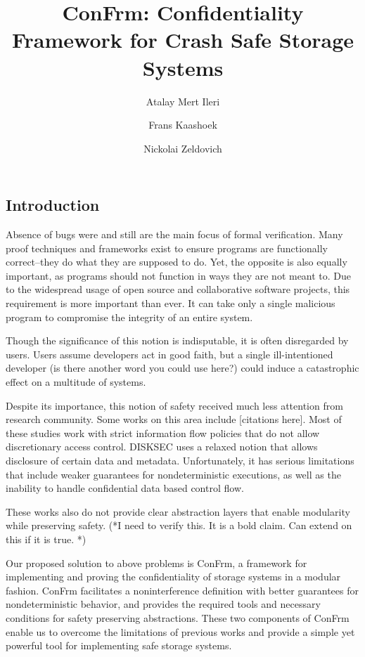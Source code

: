 \documentclass[onecolumn]{paper}
\title{ConFrm: Confidentiality Framework for Crash Safe Storage Systems}
\author{Atalay Mert Ileri \and Frans Kaashoek \and Nickolai Zeldovich}
\begin{document}
\maketitle

\subsection*{Introduction}
Absence of bugs were and still are the main focus of formal verification. Many proof techniques and frameworks exist to ensure programs are functionally correct–they do what they are supposed to do. Yet, the opposite is also equally important, as programs should not function in ways they are not meant to. Due to the widespread usage of open source and collaborative software projects, this requirement is more important than ever. It can take only a single malicious program to compromise the integrity of an entire system. 

Though the significance of this notion is indisputable, it is often disregarded by users. Users assume developers act in good faith, but a single ill-intentioned developer {\color{red}(is there another word you could use here?)} could induce a catastrophic effect on a multitude of systems.


Despite its importance, this notion of safety received much less attention from research community. Some works on this area include [citations here]. Most of these studies work with strict information flow policies that do not allow discretionary access control. DISKSEC uses a relaxed notion that allows disclosure of certain data and metadata. Unfortunately, it has serious limitations that include weaker guarantees for nondeterministic executions, as well as the inability to handle confidential data based control flow. 

These works also do not provide clear abstraction layers that enable modularity while preserving safety. (*I need to verify this. It is a bold claim. Can extend on this if it is true. *) 

Our proposed solution to above problems is ConFrm, a framework for implementing and proving the confidentiality of storage systems in a modular fashion. ConFrm facilitates a noninterference definition with better guarantees for nondeterministic behavior, and provides the required tools and necessary conditions for safety preserving abstractions. These two components of ConFrm enable us to overcome the limitations of previous works and provide a simple yet powerful tool for implementing safe storage systems. 
\end{document}
